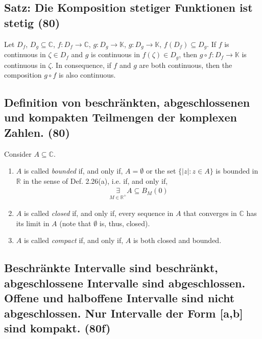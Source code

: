 \subsection{Satz: Die Komposition stetiger Funktionen ist stetig (80)}

Let $D_f$, $D_g \subseteq \mathbb { C }$, $f:D_f \rightarrow \mathbb{C}$, $g:D_g \rightarrow \mathbb{K}$, $g : D _ { g } \rightarrow \mathbb { K }$, $f ( D _ { f } ) \subseteq D _ { g }$. If $f$ is continuous in $\zeta \in D_f$ and $g$ is continuous in $f(\zeta)\in D_g$, then $g \circ f : D _ { f } \rightarrow \mathbb { K }$ is continuous in $\zeta$. In consequence, if $f$ and $g$ are both continuous, then the composition $g\circ f$ is also continuous.

\subsection{Definition von beschränkten, abgeschlossenen und kompakten Teilmengen der komplexen Zahlen. (80)}

Consider $A \subseteq \mathbb{C}$.
\begin{enumerate}[label=(\alph*)]
\item $A$ is called \textit{bounded} if, and only if, $A = \emptyset$ or the set $\{|z| : z \in A\}$ is bounded in $\mathbb{R}$
in the sense of Def. 2.26(a), i.e. if, and only if,
\begin{align}
\underset{M\in\mathbb{R}^+}{\exists} A \subseteq B _ { M } ( 0)
\end{align}
\item $A$ is called \textit{closed} if, and only if, every sequence in $A$ that converges in $\mathbb{C}$ has its limit in $A$ (note that $\emptyset$ is, thus, closed).
\item $A$ is called \textit{compact} if, and only if, $A$ is both closed and bounded.
\end{enumerate}

\subsection{Beschränkte Intervalle sind beschränkt, abgeschlossene Intervalle sind abgeschlossen. Offene und halboffene Intervalle sind nicht abgeschlossen. Nur Intervalle der Form [a,b] sind kompakt. (80f)}

